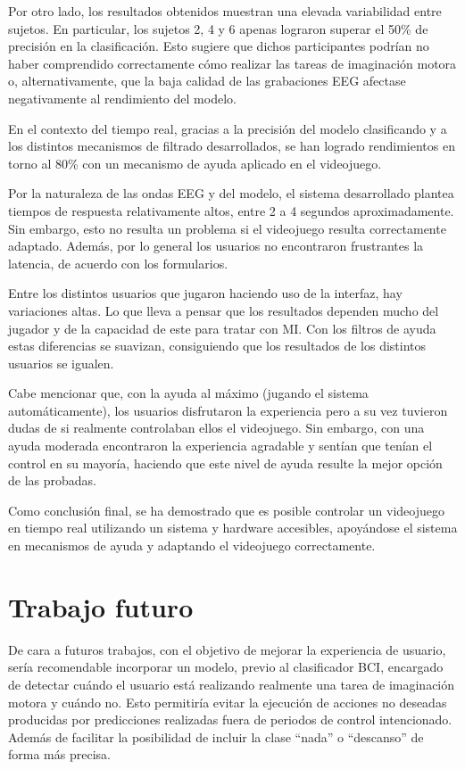 Por otro lado, los resultados obtenidos muestran una elevada variabilidad entre
sujetos. En particular, los sujetos 2, 4 y 6 apenas lograron superar el 50\%
de precisión en la clasificación. Esto sugiere que dichos participantes podrían
no haber comprendido correctamente cómo realizar las tareas de imaginación
motora o, alternativamente, que la baja calidad de las grabaciones EEG afectase
negativamente al rendimiento del modelo.

En el contexto del tiempo real, gracias a la precisión del modelo clasificando
y a los distintos mecanismos de filtrado desarrollados, se han logrado
rendimientos en torno al 80\% con un mecanismo de ayuda aplicado en el
videojuego.

Por la naturaleza de las ondas EEG y del modelo, el sistema desarrollado
plantea tiempos de respuesta relativamente altos, entre 2 a 4 segundos
aproximadamente. Sin embargo, esto no resulta un problema si el videojuego
resulta correctamente adaptado. Además, por lo general los usuarios no
encontraron frustrantes la latencia, de acuerdo con los formularios.

Entre los distintos usuarios que jugaron haciendo uso de la interfaz, hay
variaciones altas. Lo que lleva a pensar que los resultados dependen mucho del
jugador y de la capacidad de este para tratar con MI. Con los filtros de ayuda
estas diferencias se suavizan, consiguiendo que los resultados de los distintos
usuarios se igualen.

Cabe mencionar que, con la ayuda al máximo (jugando el sistema
automáticamente), los usuarios disfrutaron la experiencia pero a su vez
tuvieron dudas de si realmente controlaban ellos el videojuego. Sin embargo,
con una ayuda moderada encontraron la experiencia agradable y sentían que
tenían el control en su mayoría, haciendo que este nivel de ayuda resulte la
mejor opción de las probadas.

Como conclusión final, se ha demostrado que es posible controlar un videojuego
en tiempo real utilizando un sistema y hardware accesibles, apoyándose el
sistema en mecanismos de ayuda y adaptando el videojuego correctamente.

\section{Trabajo futuro}
\label{sec:trabajo_futuro}

De cara a futuros trabajos, con el objetivo de mejorar la experiencia de
usuario, sería recomendable incorporar un modelo, previo al clasificador BCI,
encargado de detectar cuándo el usuario está realizando realmente una tarea de
imaginación motora y cuándo no. Esto permitiría evitar la ejecución de acciones
no deseadas producidas por predicciones realizadas fuera de periodos de control
intencionado. Además de facilitar la posibilidad de incluir la clase ``nada'' o
``descanso'' de forma más precisa.

